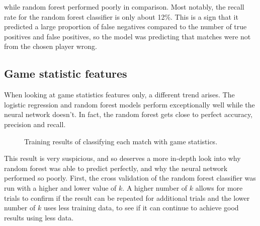 \documentclass[Report.tex]{subfiles}
\newcommand{\newaxis}[7]{
\begin{axis}[
    ybar,
    title={#1},
    ymin=#3, ymax=#4,
    bar width=1em,
    width={#5},
    height={#6},
    legend style={at={#7},anchor=north,legend columns=-1},
    enlarge x limits=0.4,
    x tick label style={align=center,text width=2cm},
    symbolic x coords={Logistic Regression, Random Forest, Multi-layer Perceptron},
    xtick=data,
    ylabel={#2}
]
}
\newcommand{\plotbar}[3] {
\addplot+[
	discard if not={features}{#1},
] table [x=model, y=#2, col sep=comma] {data/15-game-cv.csv};
\addlegendentry{#3}
}
\begin{document}
while random forest performed poorly in comparison. Most notably, the recall rate for the random forest classifier is only about 12\%. This is a sign that it predicted a large proportion of false negatives compared to the number of true positives and false positives, so the model was predicting that matches were not from the chosen player wrong. 



\subsection{Game statistic features}
When looking at game statistics features only, a different trend arises. The logistic regression and random forest models perform exceptionally well while the neural network doesn't. In fact, the random forest gets close to perfect accuracy, precision and recall. 

\begin{figure}[H]
\centering
{}
\caption{Training results of classifying each match with game statistics.}
\end{figure}

This result is very suspicious, and so deserves a more in-depth look into why random forest was able to predict perfectly, and why the neural network performed so poorly. First, the cross validation of the random forest classifier was run with a higher and lower value of $k$. A higher number of $k$ allows for more trials to confirm if the result can be repeated for additional trials and the lower number of $k$ uses less training data, to see if it can continue to achieve good results using less data. 
\end{document}
